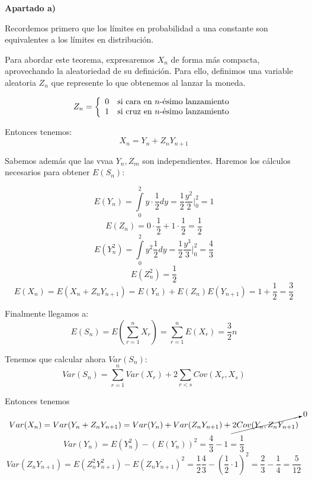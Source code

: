 \documentclass[openany]{book}
\begin{document}
\setcounter{ex}{1}
\begin{exercise}
    $  $

    \begin{flushright}
        \textbf{Apartado a)}
    \end{flushright}
    

    Recordemos primero que los límites en probabilidad a una constante son equivalentes a los límites en distribución.

    Para abordar este teorema, expresaremos $ X_n $ de forma más compacta, aprovechando la aleatoriedad de su definición. Para ello, definimos una variable aleatoria $ Z_n $ que represente lo que obtenemos al lanzar la moneda.

    $$ Z_n = \left\{
    \begin{array}{ll}
        0 & \text{si cara en $ n $-ésimo lanzamiento}\\ 
        1 & \text{si cruz en $ n $-ésimo lanzamiento}\\ 
    \end{array}
    \right. $$

    Entonces tenemos:
    $$ X_n = Y_n+Z_nY_{n+1} $$

    Sabemos además que las vvaa $ Y_n,Z_m $ son independientes. Haremos los cálculos necesarios para obtener $ E(S_n)$:

    $$ E(Y_n) = \int\limits_{0}^{2} y\cdot \dfrac{1}{2}dy = \dfrac{1}{2} \dfrac{y^2}{2} \Biggr|_{0}^{2} = 1 $$
    $$ E(Z_n) = 0\cdot \dfrac{1}{2} + 1\cdot \dfrac{1}{2} = \dfrac{1}{2} $$
    $$ E(Y_n^2) = \int\limits_{0}^{2}y^2\dfrac{1}{2}dy = \dfrac{1}{2} \dfrac{y^3}{3} \Biggr|_{0}^{2} = \dfrac{4}{3} $$
    $$ E(Z_n^2) = \dfrac{1}{2} $$
    $$ E(X_{n}) = E(X_n+Z_nY_{n+1}) = E(Y_n)+E(Z_n)E(Y_{n+1}) = 1+\dfrac{1}{2} = \dfrac{3}{2} $$


    Finalmente llegamos a:
    $$ E(S_n) = E\left(\sum\limits_{r=1}^{n}X_{r}\right) = \sum\limits_{r=1}^{n}E(X_{r}) = \dfrac{3}{2}n $$

    Tenemos que calcular ahora $ Var(S_n) $:
    $$ Var(S_n) = \sum\limits_{r=1}^{n}Var(X_{r}) +2 \sum\limits_{r<s}^{}Cov(X_{r},X_{s}) $$

    Entonces tenemos
    $$ Var(X_n) = Var(Y_n+Z_nY_{n+1}) = Var(Y_n)+Var(Z_nY_{n+1}) +\cancelto{0}{2Cov(Y_n,Z_nY_{n+1})} $$
    $$ Var(Y_n) = E(Y_n^2)-(E(Y_n))^2 = \dfrac{4}{3}-1 = \dfrac{1}{3}$$
    $$ Var(Z_nY_{n+1}) = E(Z_n^2Y_{n+1}^2)-E(Z_nY_{n+1})^2 = \dfrac{1}{2}\dfrac{4}{3}-\left(\dfrac{1}{2}\cdot 1\right)^2 = \dfrac{2}{3}-\dfrac{1}{4} = \dfrac{5}{12} $$


\end{exercise}
\end{document}
